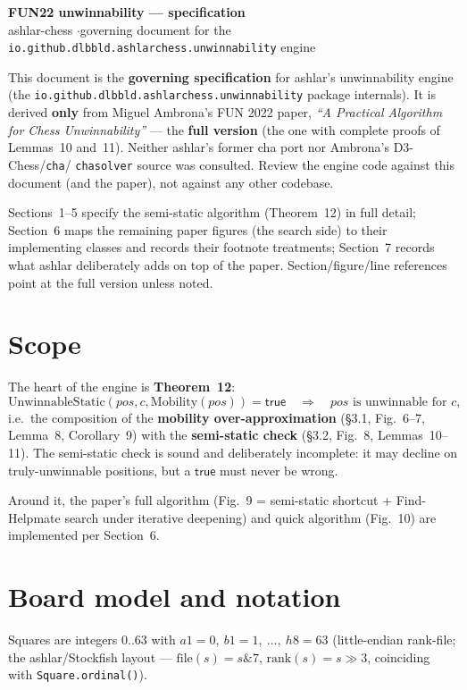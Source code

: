 \documentclass[11pt]{article}
\newcommand{\code}[1]{\texttt{#1}}
\theoremstyle{plain}
\theoremstyle{definition}
\newcommand{\pos}{\mathit{pos}}
\newcommand{\true}{\ensuremath{\mathsf{true}}}
\newcommand{\Mobility}{\mathrm{Mobility}}
\newcommand{\UnwinnableStatic}{\mathrm{UnwinnableStatic}}
\begin{document}
\begin{center}
  {\LARGE\bfseries FUN22 unwinnability --- specification}\\[0.4em]
  {\normalsize ashlar-chess \quad$\cdot$\quad governing document for the \code{io.github.dlbbld.ashlarchess.unwinnability} engine}
\end{center}

This document is the \textbf{governing specification} for ashlar's unwinnability engine (the
\code{io.github.dlbbld.ashlarchess.unwinnability} package internals). It is derived \textbf{only} from Miguel
Ambrona's FUN 2022 paper, \emph{``A Practical Algorithm for Chess Unwinnability''} --- the \textbf{full version} (the
one with complete proofs of Lemmas~10 and~11). Neither ashlar's former cha port nor Ambrona's D3-Chess/\code{cha}/%
\code{chasolver} source was consulted. Review the engine code against this document (and the paper), not against any
other codebase.

Sections~1--5 specify the semi-static algorithm (Theorem~12) in full detail; Section~6 maps the remaining paper
figures (the search side) to their implementing classes and records their footnote treatments; Section~7 records what
ashlar deliberately adds on top of the paper. Section/figure/line references point at the full version unless noted.

\section{Scope}

The heart of the engine is \textbf{Theorem~12}:
\[
  \UnwinnableStatic(\pos, c, \Mobility(\pos)) = \true \quad\Longrightarrow\quad \pos \text{ is unwinnable for } c,
\]
i.e.\ the composition of the \textbf{mobility over-approximation} (\S3.1, Fig.~6--7, Lemma~8, Corollary~9) with the
\textbf{semi-static check} (\S3.2, Fig.~8, Lemmas~10--11). The semi-static check is sound and deliberately
incomplete: it may decline on truly-unwinnable positions, but a \true{} must never be wrong.

Around it, the paper's full algorithm (Fig.~9 = semi-static shortcut + Find-Helpmate search under iterative
deepening) and quick algorithm (Fig.~10) are implemented per Section~6.

\section{Board model and notation}

Squares are integers $0..63$ with $a1 = 0,\ b1 = 1,\ \dots,\ h8 = 63$ (little-endian rank-file; the ashlar/Stockfish
layout --- $\mathrm{file}(s) = s \mathbin{\&} 7$, $\mathrm{rank}(s) = s \gg 3$, coinciding with
\code{Square.ordinal()}).
\end{document}
